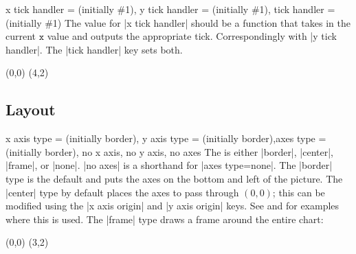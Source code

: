 \begin{sseqdata}[name = basic, cohomological Serre grading]
\begin{keylist}{x tick handler =  (initially \#1), y tick handler =  (initially \#1), tick handler =  (initially \#1)}
The value for |x tick handler| should be a function that takes in the current $\mathtt{x}$ value and outputs the appropriate tick. Correspondingly with |y tick handler|. The |tick handler| key sets both.
\begin{codeexample}[width = 7cm]
\begin{sseqpage}[ x range = {0}{4}, yscale = 1.78,
    x tick handler = {
        \ifnum#1 = 0\relax
            0
        \else
            \ifnum#1 = 1\relax
                \protect\vphantom{2}n
            \else
                #1n
            \fi
        \fi
    }
]
\class(0,0)
\class(4,2)
\end{sseqpage}
\end{codeexample}
\end{keylist}

\subsection{Layout}
\begin{keylist}{x axis type =  (initially border), y axis type =  (initially border),axes type =  (initially border), no x axis, no y axis, no axes}
The  is either |border|, |center|, |frame|, or |none|. |no axes| is a shorthand for |axes type=none|. The |border| type is the default and puts the axes on the bottom and left of the picture. The |center| type by default places the axes to pass through $(0,0)$; this can be modified using the |x axis origin| and |y axis origin| keys. See  and  for examples where this is used. The |frame| type draws a frame around the entire chart:

\begin{codeexample}[width=6cm]
\begin{sseqpage}[ axes type = frame ]
\class(0,0)
\class(3,2)
\end{sseqpage}
\end{codeexample}
\end{keylist}


\end{sseqdata}

